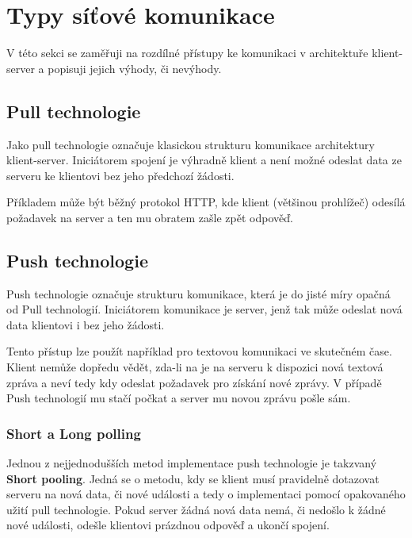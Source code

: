 
\section{Typy síťové komunikace}\label{sec:technologieProKomunikaciSeServerem}

V této sekci se zaměřuji na rozdílné přístupy ke komunikaci v architektuře klient-server a popisuji jejich výhody, či nevýhody.

\subsection{Pull technologie}\label{subsec:pullTechnologie}

Jako pull technologie označuje klasickou strukturu komunikace architektury klient-server.
Iniciátorem spojení je výhradně klient a není možné odeslat data ze serveru ke klientovi bez jeho předchozí žádosti.

Příkladem může být běžný protokol \gls{HTTP}, kde klient (většinou prohlížeč) odesílá požadavek na server a ten mu obratem zašle zpět odpověď.~\cite{pushpull:about}

\subsection{Push technologie}\label{subsec:pushTechnologie}

Push technologie označuje strukturu komunikace, která je do jisté míry opačná od Pull technologií.
Iniciátorem komunikace je server, jenž tak může odeslat nová data klientovi i bez jeho žádosti.

Tento přístup lze použít například pro textovou komunikaci ve skutečném čase.
Klient nemůže dopředu vědět, zda-li na je na serveru k dispozici nová textová zpráva a neví tedy kdy odeslat požadavek pro získání nové zprávy.
V případě Push technologií mu stačí počkat a server mu novou zprávu pošle sám.~\cite{pushpull:about}

\subsubsection{Short a Long polling}\label{subsubsec:pooling}

Jednou z nejjednodušších metod implementace push technologie je takzvaný \textbf{Short pooling}.
Jedná se o metodu, kdy se klient musí pravidelně dotazovat serveru na nová data, či nové události a tedy o implementaci pomocí opakovaného užití pull technologie.
Pokud server žádná nová data nemá, či nedošlo k žádné nové události, odešle klientovi prázdnou odpověď a ukončí spojení.

